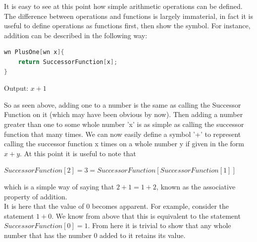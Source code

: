 It is easy to see at this point how simple arithmetic operations can be defined. The difference between operations and functions is largely immaterial, in fact it is useful to define operations as functions first, then show the symbol. For instance, addition can be described in the following way:
\begin{center}
\begin{lstlisting}[language=C,caption=Addition Function,label=lst:addFunc]
wn PlusOne[wn x]{
	return SuccessorFunction[x];
}
\end{lstlisting}
Output: $x+1$
\end{center}
So as seen above, adding one to a number is the same as calling the Successor Function on it (which may have been obvious by now). Then adding a number greater than one to some whole number 'x' is as simple as calling the successor function that many times. We can now easily define a symbol '+' to represent calling the successor function x times on a whole number y if given in the form $x+y$. At this point it is useful to note that
\begin{center}
$SuccessorFunction[2]=3=SuccessorFunction[SuccessorFunction[1]]$
\end{center}
which is a simple way of saying that $2+1=1+2$, known as the associative property of addition. \\
It is here that the value of $0$ becomes apparent. For example, consider the statement $1+0$. We know from above that this is equivalent to the statement \\ $SuccessorFunction[0]=1$. From here it is trivial to show that any whole number that has the number $0$ added to it retains its value.

